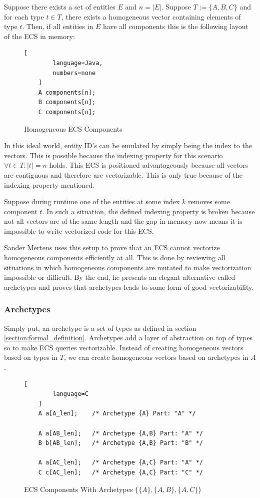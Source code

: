 Suppose there exists a set of entities $E$ and $n = |E|$. Suppose $T := \{A,B,C\}$ and for each type $t \in T$, there exists a homogeneous vector containing elements of type $t$. Then, if all entities in $E$ have all components this is the following layout of the ECS in memory:

\begin{figure}[H]
    \begin{lstlisting}[
        language=Java,
        numbers=none
    ]
    A components[n];
    B components[n];
    C components[n];
    \end{lstlisting}
    \caption{Homogeneous ECS Components}
    \label{code:homogenous_ecs}
\end{figure}

In this ideal world, entity ID's can be emulated by simply being the index to the vectors. This is possible because the indexing property for this scenario $\forall t \in T : |t| = n$ holds. This ECS is positioned advantageously because all vectors are contiguous and therefore are vectorizable. This is only true because of the indexing property mentioned.

Suppose during runtime one of the entities at some index $k$ removes some component $t$. In such a situation, the defined indexing property is broken because not all vectors are of the same length and the gap in memory now means it is impossible to write vectorized code for this ECS.

Sander Mertens uses this setup to prove that an ECS cannot vectorize homogeneous components efficiently at all. This is done by reviewing all situations in which homogeneous components are mutated to make vectorization impossible or difficult. By the end, he presents an elegant alternative called archetypes and proves that archetypes leads to some form of good vectorizability.

\subsubsection{Archetypes}
Simply put, an archetype is a set of types as defined in section \ref{section:formal_definition}. Archetypes add a layer of abstraction on top of types so to make ECS queries vectorizable. Instead of creating homogeneous vectors based on types in $T$, we can create homogeneous vectors based on archetypes in $A$. 

\begin{figure}[H]
    \begin{lstlisting}[
        language=C
    ]
    A a[A_len];    /* Archetype {A} Part: "A" */

    A a[AB_len];   /* Archetype {A,B} Part: "A" */
    B b[AB_len];   /* Archetype {A,B} Part: "B" */

    A a[AC_len];   /* Archetype {A,C} Part: "A" */
    C c[AC_len];   /* Archetype {A,C} Part: "C" */
    \end{lstlisting}
    \caption{ECS Components With Archetypes $\{\{A\},\{A,B\},\{A,C\}\}$}
    \label{code:ecs_archetypes}
\end{figure}

